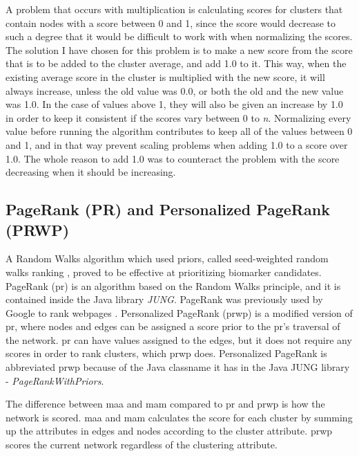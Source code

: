 A problem that occurs with multiplication is calculating scores for clusters
that contain nodes with a score between 0 and 1, since the score would decrease
to such a degree that it would be difficult to work with when normalizing the
scores. The solution I have chosen for this problem is to make a new score from
the score that is to be added to the cluster average, and add 1.0 to it. This
way, when the existing average score in the cluster is multiplied with the new
score, it will always increase, unless the old value was 0.0, or both the old
and the new value was 1.0. In the case of values above 1, they will also be
given an increase by 1.0 in order to keep it consistent if the scores vary
between 0 to \textit{n}. Normalizing every value before running the algorithm
contributes to keep all of the values between 0 and 1, and in that way prevent
scaling problems when adding 1.0 to a score over 1.0. The whole reason to add
1.0 was to counteract the problem with the score decreasing when it should be
increasing.

\subsection{PageRank (PR) and Personalized PageRank (PRWP)} 
A Random Walks\cite{random-walks2} algorithm which used priors, called
seed-weighted random walks ranking \cite{sw-rwr}, proved to be effective at
prioritizing biomarker candidates. PageRank (\gls{pr}) is an algorithm based on
the Random Walks principle, and it is contained inside the Java library
\textit{JUNG}\cite{jung}. PageRank was previously used by Google to rank
webpages \cite{pagerank}. Personalized PageRank (\gls{prwp})\cite{pr-bio} is a
modified version of \gls{pr}, where nodes and edges can be assigned a score
prior to the \gls{pr}'s traversal of the network. \gls{pr} can have values
assigned to the edges, but it does not require any scores in order to rank
clusters, which \gls{prwp} does. Personalized PageRank is abbreviated \gls{prwp}
because of the Java classname it has in the Java JUNG library
- \textit{PageRankWithPriors}.

The difference between \gls{maa} and \gls{mam} compared to \gls{pr} and
\gls{prwp} is how the network is scored. \gls{maa} and \gls{mam} calculates the
score for each cluster by summing up the attributes in edges and nodes according
to the cluster attribute. \gls{prwp} scores the current network regardless of
the clustering attribute. 

